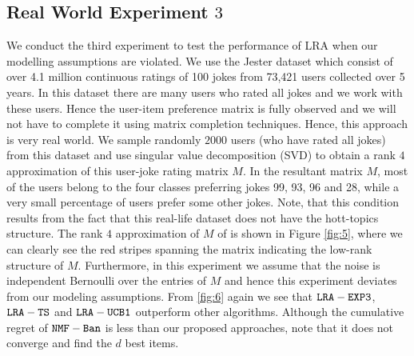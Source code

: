 \subsection{Real World Experiment $3$}
We conduct the third experiment to test the performance of LRA when our modelling assumptions are violated. We use the Jester dataset \citep{goldberg2001eigentaste} which consist of over 4.1 million continuous ratings of 100 jokes from 73,421 users collected over 5 years. In this dataset there are many users who rated all jokes and we work with these users. Hence the user-item preference matrix is fully observed and we will not have to complete it using matrix completion techniques. Hence, this approach is very real world. We sample randomly $2000$ users (who have rated all jokes) from this dataset and use singular value decomposition (SVD) to obtain a rank $4$ approximation of this user-joke rating matrix $M$. In the resultant matrix $M$, most of the users belong to the four classes preferring jokes 99, 93, 96 and 28, while a very small percentage of users prefer some other jokes. Note, that this condition results from the fact that this real-life dataset does not have the hott-topics structure. The rank $4$ approximation of $M$ of  is shown in Figure \ref{fig:5}, where we can clearly see the red stripes spanning the matrix indicating the low-rank structure of $M$. Furthermore, in this experiment we assume that the noise is independent Bernoulli over the entries of $M$ and hence this experiment deviates from our modeling assumptions. From \ref{fig:6} again we see that ${\tt LRA-EXP3}$, ${\tt LRA-TS}$ and ${\tt LRA-UCB1}$ outperform other algorithms. Although the cumulative regret of ${\tt NMF-Ban}$ is less than our proposed approaches, note that it does not converge and find the $d$ best items.




